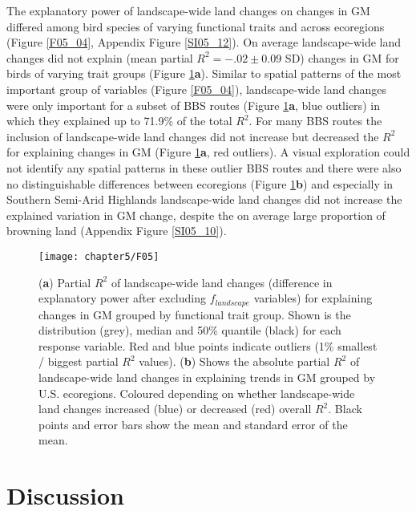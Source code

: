 The explanatory power of landscape-wide land changes on changes in GM differed among bird species of varying functional traits and across ecoregions (Figure \ref{F05_04}, Appendix Figure \ref{SI05_12}). On average landscape-wide land changes did not explain (mean partial $R^2 = -.02 \pm 0.09$ SD) changes in GM for birds of varying trait groups (Figure \ref{F05_05}\textbf{a}). Similar to spatial patterns of the most important group of variables (Figure \ref{F05_04}), landscape-wide land changes were only important for a subset of BBS routes (Figure \ref{F05_05}\textbf{a}, blue outliers) in which they explained up to 71.9\% of the total $R^2$. For many BBS routes the inclusion of landscape-wide land changes did not increase but decreased the $R^2$ for explaining changes in GM (Figure \ref{F05_05}\textbf{a}, red outliers). A visual exploration could not identify any spatial patterns in these outlier BBS routes and there were also no distinguishable differences between ecoregions (Figure \ref{F05_05}\textbf{b}) and especially in Southern Semi-Arid Highlands landscape-wide land changes did not increase the explained variation in GM change, despite the on average large proportion of browning land (Appendix Figure \ref{SI05_10}).

\begin{figure}[htb]
\centering
\texttt{[image: chapter5/F05]}
\caption{(\textbf{a}) Partial $R^2$ of landscape-wide land changes (difference in explanatory power after excluding $f_{landscape}$ variables) for explaining changes in GM grouped by functional trait group. Shown is the distribution (grey), median and 50\% quantile (black) for each response variable. Red and blue points indicate outliers (1\% smallest / biggest partial $R^2$ values). (\textbf{b}) Shows the absolute partial $R^2$ of landscape-wide land changes in explaining trends in GM grouped by U.S. ecoregions. Coloured depending on whether landscape-wide land changes increased (blue) or decreased (red) overall $R^2$. Black points and error bars show the mean and standard error of the mean.}
\label{F05_05}
\end{figure}

\section{Discussion}
\label{C05_04}

